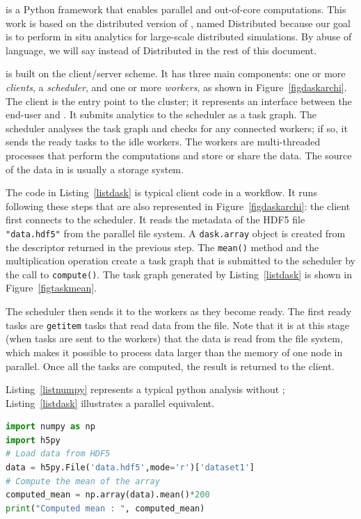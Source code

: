 \dask is a Python framework that enables parallel and out-of-core computations. This work is based on the distributed version of \dask, named \dask Distributed because our goal is to perform in situ analytics for large-scale distributed simulations.
By abuse of language, we will say \dask instead of \dask Distributed in the rest of this document. 

\dask is built on the client/server scheme. 
It has three main components: one or more \textit{clients}, a \textit{scheduler}, and one or more \textit{workers}, as shown in Figure~\ref{figdaskarchi}. 
The client is the entry point to the \dask cluster; it represents an interface between the end-user and \dask. It submits analytics to the scheduler as a task graph. 
The scheduler analyses the task graph and checks for any connected workers; if so, it sends the ready tasks to the idle workers. The workers are multi-threaded processes that perform the computations and store or share the data.
The source of the data in \dask is usually a storage system.

The code in Listing~\ref{listdask} is typical client code in a \dask workflow. It runs following these steps that are also represented in Figure~\ref{figdaskarchi}: 
the client first connects to the scheduler. 
It reads the metadata of the HDF5 file \texttt{"data.hdf5"} from the parallel file system. 
A \texttt{dask.array} object is created from the descriptor returned in the previous step. 
The \texttt{mean()} method and the multiplication operation create a task graph that is submitted to the scheduler by the call to \texttt{compute()}. The task graph generated by Listing~\ref{listdask} is shown in Figure~\ref{figtaskmean}. 

The scheduler then sends it to the workers as they become ready. 
The first ready tasks are \texttt{getitem} tasks that read data from the file.  
Note that it is at this stage (when tasks are sent to the workers) that the data is read from the file system, which makes it possible to process data larger than the memory of one node in parallel.
Once all the tasks are computed, the result is returned to the client.

Listing~\ref{listnumpy} represents a typical python analysis without \dask; Listing~\ref {listdask} illustrates a \dask parallel equivalent. 

\begin{lstlisting}[float=h!, label=listnumpy, language=python, caption=Sequential post hoc mean using numpy]
import numpy as np
import h5py
# Load data from HDF5
data = h5py.File('data.hdf5',mode='r')['dataset1']
# Compute the mean of the array
computed_mean = np.array(data).mean()*200
print("Computed mean : ", computed_mean)
\end{lstlisting}

